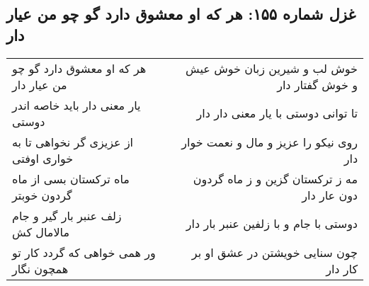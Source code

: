 \begin{center}
\section*{غزل شماره ۱۵۵: هر که او معشوق دارد گو چو من عیار دار}
\label{sec:155}
\begin{longtable}{l p{0.5cm} r}
هر که او معشوق دارد گو چو من عیار دار
&&
خوش لب و شیرین زبان خوش عیش و خوش گفتار دار
\\
یار معنی دار باید خاصه اندر دوستی
&&
تا توانی دوستی با یار معنی دار دار
\\
از عزیزی گر نخواهی تا به خواری اوفتی
&&
روی نیکو را عزیز و مال و نعمت خوار دار
\\
ماه ترکستان بسی از ماه گردون خوبتر
&&
مه ز ترکستان گزین و ز ماه گردون دون عار دار
\\
زلف عنبر بار گیر و جام مالامال کش
&&
دوستی با جام و با زلفین عنبر بار دار
\\
ور همی خواهی که گردد کار تو همچون نگار
&&
چون سنایی خویشتن در عشق او بر کار دار
\\
\end{longtable}
\end{center}
